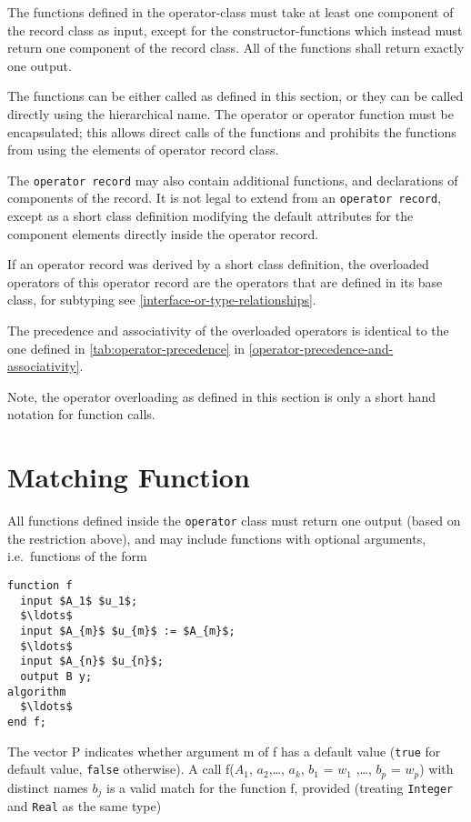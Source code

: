 The functions defined in the operator-class must take at least one
component of the record class as input, except for the
constructor-functions which instead must return one component of the
record class. All of the functions shall return exactly one output.

The functions can be either called as defined in this section, or they
can be called directly using the hierarchical name. The operator or
operator function must be encapsulated; this allows direct calls of the
functions and prohibits the functions from using the elements of
operator record class.

The \lstinline!operator record! may also contain additional functions, and
declarations of components of the record. It is not legal to extend from
an \lstinline!operator record!, except as a short class definition modifying the
default attributes for the component elements directly inside the
operator record.

If an operator record was derived by a short class definition, the
overloaded operators of this operator record are the operators that are
defined in its base class, for subtyping see \cref{interface-or-type-relationships}.

The precedence and associativity of the overloaded operators is
identical to the one defined in \cref{tab:operator-precedence} in \cref{operator-precedence-and-associativity}.

\begin{nonnormative}
Note, the operator overloading as defined in this section is
only a short hand notation for function calls.
\end{nonnormative}

\section{Matching Function}\label{matching-function}

All functions defined inside the \lstinline!operator! class must return one
output (based on the restriction above), and may include functions with
optional arguments, i.e.\ functions of the form

\begin{lstlisting}[language=modelica]
function f
  input $A_1$ $u_1$;
  $\ldots$
  input $A_{m}$ $u_{m}$ := $A_{m}$;
  $\ldots$
  input $A_{n}$ $u_{n}$;
  output B y;
algorithm
  $\ldots$
end f;
\end{lstlisting}
The vector P indicates whether argument m of f has a default value (\lstinline!true! for default value, \lstinline!false! otherwise).  A call
f($A_1$, $a_{2}$,\ldots{}, $a_{k}$, $b_{1}$ = $w_{1}$ ,\ldots{}, $b_{p}$ = $w_{p}$)
with distinct names $b_{j}$ is a valid match for the function f, provided (treating \lstinline!Integer! and \lstinline!Real! as the same type)

